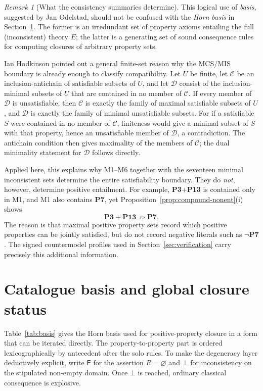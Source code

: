 \documentclass[11pt,a4paper,reqno]{amsart}
\theoremstyle{definition}
\theoremstyle{remark}
\newtheorem{remark}[proposition]{Remark}
\newcommand{\prop}[1]{\textbf{P#1}}
\newcommand{\catnotentails}{\not\Rightarrow}
\begin{document}
\begin{remark}[What the consistency summaries determine]
This logical use of \emph{basis}, suggested by Jan Odelstad, should not be
confused with the \emph{Horn basis} in Section~\ref{sec:table}.  The former is
an irredundant set of property axioms entailing the full (inconsistent) theory
$E$; the latter is a generating set of sound consequence rules for computing
closures of arbitrary property sets.

Ian Hodkinson pointed out a general finite-set reason why the MCS/MIS boundary
is already enough to classify compatibility.  Let $U$ be finite, let
$\mathcal C$ be an inclusion-antichain of satisfiable subsets of $U$, and let
$\mathcal D$ consist of the inclusion-minimal subsets of $U$ that are contained
in no member of $\mathcal C$.  If every member of $\mathcal D$ is
unsatisfiable, then $\mathcal C$ is exactly the family of maximal satisfiable
subsets of $U$, and $\mathcal D$ is exactly the family of minimal
unsatisfiable subsets.  For if a satisfiable $S$ were contained in no member of
$\mathcal C$, finiteness would give a minimal subset of $S$ with that property,
hence an unsatisfiable member of $\mathcal D$, a contradiction.  The
antichain condition then gives maximality of the members of $\mathcal C$; the
dual minimality statement for $\mathcal D$ follows directly.

Applied here, this explains why M1--M6 together with the seventeen minimal
inconsistent sets determine the entire satisfiability boundary.  They do
\emph{not}, however, determine positive entailment.  For example,
\prop{3}+\prop{13} is contained only in M1, and M1 also contains \prop{7}, yet
Proposition~\ref{prop:compound-nonent}(i) shows
\[
\prop{3}+\prop{13}\catnotentails\prop{7}.
\]
The reason is that maximal positive property sets record which positive
properties can be jointly satisfied, but do not record negative literals such
as $\neg\prop{7}$.  The signed countermodel profiles used in
Section~\ref{sec:verification} carry precisely this additional information.
\end{remark}

\section{Catalogue basis and global closure status}\label{sec:table}

Table~\ref{tab:basis} gives the Horn basis used for positive-property closure
in a form that can be iterated directly.  The property-to-property part is
ordered lexicographically by antecedent after the solo rules.  To make the
degeneracy layer deductively explicit, write $\mathsf{E}$ for the assertion
$R=\varnothing$ and $\bot$ for inconsistency on the stipulated non-empty
domain.  Once $\bot$ is reached, ordinary classical consequence is explosive.
\end{document}
